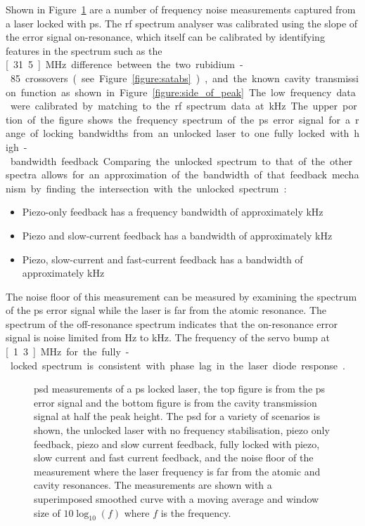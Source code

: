 Shown in Figure~\ref{figure:psd} are a number of frequency noise measurements captured from a laser locked with \gls{ps}.
The \gls{rf} spectrum analyser was calibrated using the slope of the error signal on-resonance, which itself can be calibrated by identifying features in the spectrum such as the \unit[31.5]{MHz} difference between the two rubidium-85 crossovers (see Figure~\ref{figure:satabs}), and the known cavity transmission function as shown in Figure~\ref{figure:side_of_peak}.
The low frequency data were calibrated by matching to the \gls{rf} spectrum data at \unit[10]{kHz}.
The upper portion of the figure shows the frequency spectrum of the \gls{ps} error signal for a range of locking bandwidths from an unlocked laser to one fully locked with high-bandwidth feedback.
Comparing the unlocked spectrum to that of the other spectra allows for an approximation of the bandwidth of that feedback mechanism by finding the intersection with the unlocked spectrum:
\begin{itemize}
    \item Piezo-only feedback has a frequency bandwidth of approximately \unit[1]{kHz}
    \item Piezo and slow-current feedback has a bandwidth of approximately \unit[50]{kHz}
    \item Piezo, slow-current and fast-current feedback has a bandwidth of approximately \unit[500]{kHz}
\end{itemize}
The noise floor of this measurement can be measured by examining the spectrum of the \gls{ps} error signal while the laser is far from the atomic resonance.
The spectrum of the off-resonance spectrum indicates that the on-resonance error signal is noise limited from \unit[450]{Hz} to \unit[350]{kHz}.
The frequency of the servo bump at \unit[1.3]{MHz} for the fully-locked spectrum is consistent with phase lag in the laser diode response~\cite{wieman_using_1991}.

\begin{figure}
\center

\caption[Laser frequency noise power spectral density from polarisation spectroscopy error signal and cavity transmission for a polarisation spectroscopy locked laser.]{\Gls{psd} measurements of a \gls{ps} locked laser, the top figure is from the \gls{ps} error signal and the bottom figure is from the cavity transmission signal at half the peak height.
The \gls{psd} for a variety of scenarios is shown, the unlocked laser with no frequency stabilisation, piezo only feedback, piezo and slow current feedback, fully locked with piezo, slow current and fast current feedback, and the noise floor of the measurement where the laser frequency is far from the atomic and cavity resonances.
The measurements are shown with a superimposed smoothed curve with a moving average and window size of $10\log_{10}(f)$ where $f$ is the frequency.}
\label{figure:psd}
\end{figure}

